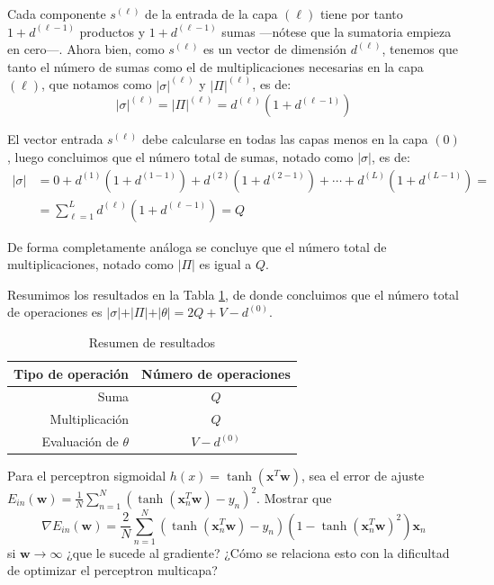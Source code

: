 \documentclass[a4paper, 11pt]{article}
\begin{document}
\begin{solucion}
\begin{solucion}
         Cada componente $s^{(\ell)}$ de la entrada de la capa ${(\ell)}$ tiene por tanto $1 + d^{(\ell-1)}$ productos y $1 + d^{(\ell-1)}$ sumas ---nótese que la sumatoria empieza en cero---. Ahora bien, como $s^{(\ell)}$ es un vector de dimensión $d^{(\ell)}$, tenemos que tanto el número de sumas como el de multiplicaciones necesarias en la capa ${(\ell)}$, que notamos como $\vert\sigma\vert^{(\ell)}$ y $\vert\Pi\vert^{(\ell)}$, es de:
         \[
         \vert\sigma\vert^{(\ell)} = \vert\Pi\vert^{(\ell)} = d^{(\ell)}(1 + d^{(\ell-1)})
         \]

         El vector entrada $s^{(\ell)}$ debe calcularse en todas las capas menos en la capa $(0)$, luego concluimos que el número total de sumas, notado como  $\vert\sigma\vert$, es de:
         \begin{align*}
             \vert\sigma\vert &= 0 + d^{(1)}(1 + d^{(1-1)}) + d^{(2)}(1 + d^{(2-1)}) + \cdots + d^{(L)}(1 + d^{(L-1)}) = \\
             &= \sum_{\ell=1}^L d^{(\ell)}(1 + d^{(\ell-1)}) = Q
         \end{align*}

         De forma completamente análoga se concluye que el número total de multiplicaciones, notado como $\vert\Pi\vert$ es igual a $Q$.

         Resumimos los resultados en la Tabla \ref{tab:oper}, de donde concluimos que el número total de operaciones es $\vert\sigma\vert + \vert\Pi\vert + \vert\theta\vert = 2Q + V - d^{(0)}$.

         \begin{table}[!htb]
             \centering
             \begin{tabular}{|r|c|}
                 \hline
                 Tipo de operación & Número de operaciones \\
                 \hline \hline
                 Suma & $Q$ \\
                 Multiplicación & $Q$ \\
                 Evaluación de $\theta$ & $V - d^{(0)}$ \\
                 \hline
             \end{tabular}
             \caption{Resumen de resultados}
             \label{tab:oper}
         \end{table}
      \end{solucion}

      \begin{ejercicio}
          Para el perceptron sigmoidal $h(x)=\tanh(\textbf{x}^T\textbf{w})$, sea el error de ajuste $ E_{in}(\textbf{w})=\frac{1}{N}\sum_{n=1}^N(\tanh(\textbf{x}_n^T\textbf{w}) - y_n )^2$. Mostrar que
          \[
          \nabla E_{in}(\textbf{w})=\frac{2}{N}\sum_{n=1}^N(\tanh(\textbf{x}_n^T\textbf{w}) - y_n )(1-\tanh(\textbf{x}_n^T\textbf{w})^2)\textbf{x}_n
          \]
          si $\textbf{w}\rightarrow\infty$ ¿que le sucede al gradiente? ¿Cómo se relaciona esto con la dificultad de optimizar el perceptron multicapa?
      \end{ejercicio}


\end{solucion}
\end{document}
